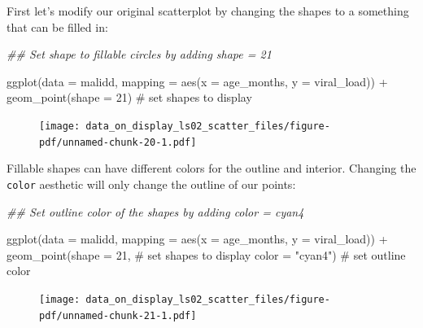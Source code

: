 \documentclass[
  letterpaper,
  DIV=11,
  numbers=noendperiod]{scrreprt}
\newenvironment{Shaded}{\begin{snugshade}}{\end{snugshade}}
\newcommand{\AttributeTok}[1]{\textcolor[rgb]{0.40,0.45,0.13}{#1}}
\newcommand{\CommentTok}[1]{\textcolor[rgb]{0.37,0.37,0.37}{#1}}
\newcommand{\DecValTok}[1]{\textcolor[rgb]{0.68,0.00,0.00}{#1}}
\newcommand{\DocumentationTok}[1]{\textcolor[rgb]{0.37,0.37,0.37}{\textit{#1}}}
\newcommand{\FunctionTok}[1]{\textcolor[rgb]{0.28,0.35,0.67}{#1}}
\newcommand{\NormalTok}[1]{\textcolor[rgb]{0.00,0.23,0.31}{#1}}
\newcommand{\SpecialCharTok}[1]{\textcolor[rgb]{0.37,0.37,0.37}{#1}}
\newcommand{\StringTok}[1]{\textcolor[rgb]{0.13,0.47,0.30}{#1}}
\begin{document}
First let's modify our original scatterplot by changing the shapes to a
something that can be filled in:

\begin{Shaded}
\begin{Highlighting}[]
\DocumentationTok{\#\# Set shape to fillable circles by adding \textasciigrave{}shape = 21\textasciigrave{}}

\FunctionTok{ggplot}\NormalTok{(}\AttributeTok{data =}\NormalTok{ malidd, }
       \AttributeTok{mapping =} \FunctionTok{aes}\NormalTok{(}\AttributeTok{x =}\NormalTok{ age\_months, }
                     \AttributeTok{y =}\NormalTok{ viral\_load)) }\SpecialCharTok{+} 
  \FunctionTok{geom\_point}\NormalTok{(}\AttributeTok{shape =} \DecValTok{21}\NormalTok{)                }\CommentTok{\# set shapes to display}
\end{Highlighting}
\end{Shaded}

\begin{figure}[H]

{\centering \texttt{[image: data\_on\_display\_ls02\_scatter\_files/figure-pdf/unnamed-chunk-20-1.pdf]}

}

\end{figure}

Fillable shapes can have different colors for the outline and interior.
Changing the \texttt{color} aesthetic will only change the outline of
our points:

\begin{Shaded}
\begin{Highlighting}[]
\DocumentationTok{\#\# Set outline color of the shapes by adding \textasciigrave{}color = cyan4\textasciigrave{}}

\FunctionTok{ggplot}\NormalTok{(}\AttributeTok{data =}\NormalTok{ malidd, }
       \AttributeTok{mapping =} \FunctionTok{aes}\NormalTok{(}\AttributeTok{x =}\NormalTok{ age\_months, }
                     \AttributeTok{y =}\NormalTok{ viral\_load)) }\SpecialCharTok{+} 
  \FunctionTok{geom\_point}\NormalTok{(}\AttributeTok{shape =} \DecValTok{21}\NormalTok{,                }\CommentTok{\# set shapes to display}
             \AttributeTok{color =} \StringTok{"cyan4"}\NormalTok{)           }\CommentTok{\# set outline color}
\end{Highlighting}
\end{Shaded}

\begin{figure}[H]

{\centering \texttt{[image: data\_on\_display\_ls02\_scatter\_files/figure-pdf/unnamed-chunk-21-1.pdf]}

}

\end{figure}
\end{document}
